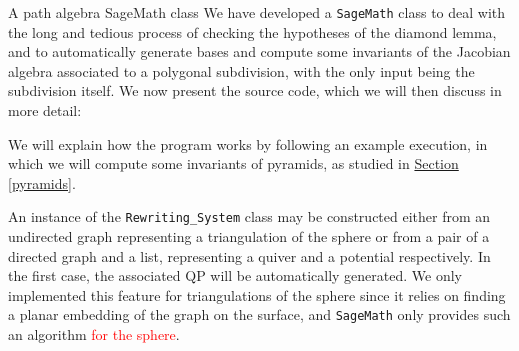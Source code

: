 \begin{chapter}{A path algebra SageMath class}
\label{appendix}
We have developed a \texttt{SageMath} class to deal with the long and tedious process of checking the hypotheses of the diamond lemma, and to automatically generate bases and compute some invariants of the Jacobian algebra associated to a polygonal subdivision, with the only input being the subdivision itself. We now present the source code, which we will then discuss in more detail:

We will explain how the program works by following an example execution, in which we will compute some invariants of pyramids, as studied in \hyperref[pyramids]{Section \ref*{pyramids}}.

An instance of the \texttt{Rewriting\_System} class may be constructed either from an undirected graph representing a triangulation of the sphere or from a pair of a directed graph and a list, representing a quiver and a potential respectively. In the first case, the associated QP will be automatically generated. We only implemented this feature for triangulations of the sphere since it relies on finding a planar embedding of the graph on the surface, and \texttt{SageMath} only provides such an algorithm \textcolor{red}{for the sphere}.


\end{chapter}
